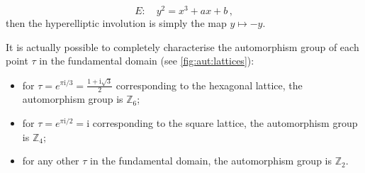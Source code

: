 \documentclass[11pt,reqno]{amsart}
\numberwithin{equation}{section}
\newcommand{\iu}{\mathrm{i}}
\newcommand{\mb}[1]{\mathbb{#1}}
\newcommand{\Z}{\mb{Z}}
\theoremstyle{plain}
\theoremstyle{definition}
\begin{document}
\begin{equation}
  E \colon
  \quad
  y^2 = x^3 + ax + b \,,
\end{equation}
then the hyperelliptic involution is simply the map $y \mapsto -y$.

It is actually possible to completely characterise the automorphism group of each point $\tau$ in the fundamental domain (see \cref{fig:aut:lattices}):
\begin{itemize}
  \item for $\tau =  e^{\pi\iu/3} = \frac{1 + \iu\sqrt{3}}{2}$ corresponding to the hexagonal lattice, the automorphism group is $\Z_6$;

  \item for $\tau = e^{\pi\iu/2} = \iu$ corresponding to the square lattice, the automorphism group is $\Z_4$;

  \item for any other $\tau$ in the fundamental domain, the automorphism group is $\Z_2$.
\end{itemize}
%
\end{document}

